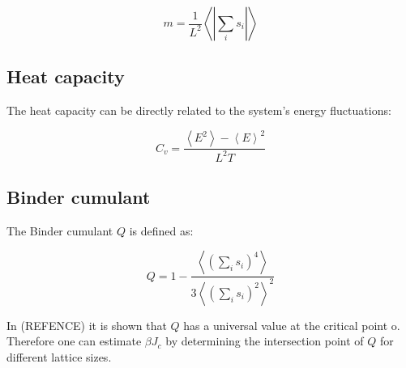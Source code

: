 \documentclass[twoside]{article}
\def\mean#1{\left< #1 \right>}
\begin{document}
\begin{multicols}{2}
\begin{equation}
m = \frac{1}{L^2} \mean{\left|\sum_i s_i\right|}
\end{equation}

\subsection{Heat capacity}
The heat capacity can be directly related to the system's energy fluctuations:

\begin{equation}
C_v = \frac{\mean{E^2} - \mean{E}^2}{L^2 T}
\end{equation}

\subsection{Binder cumulant}
The Binder cumulant $Q$ is defined as:

\begin{equation}
Q = 1 - \frac{\mean{\left( \sum_i s_i \right)^4}}{3 \mean{\left( \sum_i s_i \right)^2}^2}
\end{equation}

In (REFENCE) it is shown that $Q$ has a universal value at the critical point o. Therefore one can estimate $\beta J_c$ by determining the intersection point of $Q$ for different lattice sizes.


\end{multicols}
\end{document}
